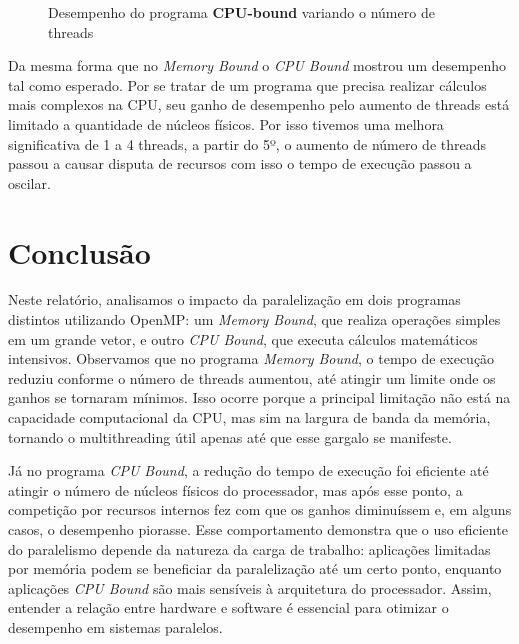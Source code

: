 \documentclass[a4paper, 12pt]{article}
\begin{document}
	\begin{figure}[H]
		\centering
		\caption{Desempenho do programa \textbf{CPU-bound} variando o número de threads}
		\label{fig:cpu-bound}
	\end{figure}
	
	Da mesma forma que no \textit{Memory Bound} o \textit{CPU Bound} mostrou um desempenho tal como esperado. Por se tratar de um programa que precisa realizar cálculos mais complexos na CPU, seu ganho de desempenho pelo aumento de threads está limitado a quantidade de núcleos físicos. Por isso tivemos uma melhora significativa de 1 a 4 threads, a partir do 5º, o aumento de número de threads passou a causar disputa de recursos com isso o tempo de execução passou a oscilar.
	
	\section{Conclusão}
	
	\hspace{.7cm}Neste relatório, analisamos o impacto da paralelização em dois programas distintos utilizando OpenMP: um \textit{Memory Bound}, que realiza operações simples em um grande vetor, e outro \textit{CPU Bound}, que executa cálculos matemáticos intensivos. Observamos que no programa \textit{Memory Bound}, o tempo de execução reduziu conforme o número de threads aumentou, até atingir um limite onde os ganhos se tornaram mínimos. Isso ocorre porque a principal limitação não está na capacidade computacional da CPU, mas sim na largura de banda da memória, tornando o multithreading útil apenas até que esse gargalo se manifeste.
	
	Já no programa \textit{CPU Bound}, a redução do tempo de execução foi eficiente até atingir o número de núcleos físicos do processador, mas após esse ponto, a competição por recursos internos fez com que os ganhos diminuíssem e, em alguns casos, o desempenho piorasse. Esse comportamento demonstra que o uso eficiente do paralelismo depende da natureza da carga de trabalho: aplicações limitadas por memória podem se beneficiar da paralelização até um certo ponto, enquanto aplicações \textit{CPU Bound} são mais sensíveis à arquitetura do processador. Assim, entender a relação entre hardware e software é essencial para otimizar o desempenho em sistemas paralelos.
	
\end{document}
